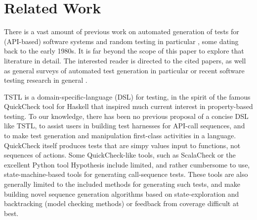 \section{Related Work}
\label{sec:related}

There is a vast amount of previous work on automated generation of
tests for (API-based) software systems
\cite{Pacheco,FA11,GodefroidKS05} and random testing in particular
\cite{ICSEDiff,Pacheco,AMFL11,ARTChen,ISSTAART,FASE,HamletOnly,Hamlet94,ClaessenH00,CiupaLOM07,RandFormal,woda08,andrews-etal-rute-rt,ASE08,evalrand},
some dating back to the early 1980s. It is far beyond the scope of
this paper to explore that literature in detail.  The interested
reader is directed to the cited papers, as well as general surveys of
automated test generation in particular \cite{anand2013orchestrated}
or recent software testing research in general \cite{orsofuse}.  


TSTL is a domain-specific-language (DSL) \cite{Fow10} for testing, in
the spirit of the famous QuickCheck tool for Haskell
\cite{ClaessenH00} that inspired much current interest in
property-based testing.  To our knowledge, there has been no previous
proposal of a concise DSL like TSTL, to assist users in building test
harnesses for API-call sequences, and to make test generation and
manipulation first-class activities in a language.  QuickCheck itself
produces tests that are simpy values input to functions, not sequences
of actions.  Some QuickCheck-like tools, such as ScalaCheck
\cite{ScalaCheck} or the excellent Python tool Hypothesis
\cite{hypothesis} include limited, and rather cumbersome to use,
state-machine-based tools for generating call-sequence tests.  These
tools are also generally limited to the included methods for
generating such tests, and make building novel sequence generation
algorithms based on state-exploration and backtracking (model checking
methods) or feedback from coverage difficult at best.

